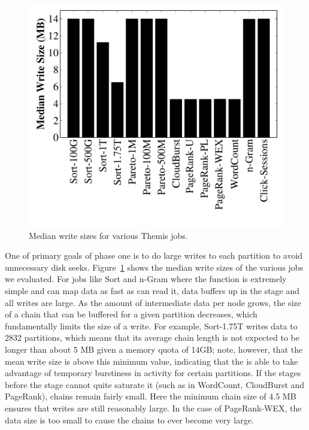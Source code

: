 \begin{figure}
  \includegraphics[width=\columnwidth]{themis/graphs/write_sizes_median_bars.pdf}
  \caption{\label{fig:write_sizes} Median write sizes for various Themis jobs.}
\end{figure}

One of primary goals of phase one is to do large writes to each partition to
avoid unnecessary disk seeks.  Figure~\ref{fig:write_sizes} shows the median
write sizes of the various jobs we evaluated.  For jobs like Sort and n-Gram
where the \map function is extremely simple and \mappers can map data as fast
as \readers can read it, data buffers up in the \Chainer stage and all writes
are large. As the amount of intermediate data per node grows, the size of a
chain that can be buffered for a given partition decreases, which fundamentally
limits the size of a write. For example, Sort-1.75T writes data to 2832
partitions, which means that its average chain length is not expected to be
longer than about 5 MB given a \receiver memory quota of 14GB; note, however,
that the mean write size is above this minimum value, indicating that the
\writer is able to take advantage of temporary burstiness in activity for
certain partitions.  If the stages before the \Writer stage cannot quite
saturate it (such as in WordCount, CloudBurst and PageRank), chains remain
fairly small. Here the minimum chain size of 4.5 MB ensures that writes are
still reasonably large. In the case of PageRank-WEX, the data size is
too small to cause the chains to ever become very large.
